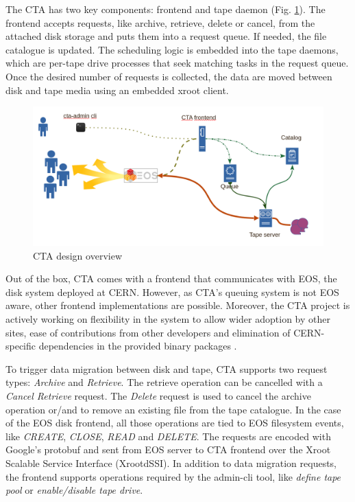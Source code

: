 \documentclass{webofc}
\begin{document}
The CTA has two key components: frontend and tape daemon (Fig. \ref{fig:cta_overview}). The frontend accepts requests, like archive, retrieve, delete or cancel, from the attached disk storage and puts them into a request queue. If needed, the file catalogue is updated. The scheduling logic is embedded into the tape daemons, which are per-tape drive processes that seek matching tasks in the request queue. Once the desired number of requests is collected, the data are moved between disk and tape media using an embedded xroot\cite{xrootd} client.

\begin{figure}[h]
    \centering
    \includegraphics[scale=0.25]{cta-design.png}
    \caption{CTA design overview}
    \label{fig:cta_overview}
\end{figure}

Out of the box, CTA comes with a frontend that communicates with EOS, the disk system deployed at CERN. However, as CTA's queuing system is not EOS aware, other frontend implementations are possible. Moreover, the CTA project is actively working on flexibility in the system to allow wider adoption by other sites, ease of contributions from other developers and elimination of CERN-specific dependencies in the provided binary packages \cite{cta_beyond_cern}.

To trigger data migration between disk and tape, CTA supports two request types: \textit{Archive} and \textit{Retrieve}. The retrieve operation can be cancelled with a \textit{Cancel Retrieve} request. The \textit{Delete} request is used to cancel the archive operation or/and to remove an existing file from the tape catalogue. In the case of the EOS disk frontend, all those operations are tied to EOS filesystem events, like \textit{CREATE}, \textit{CLOSE}, \textit{READ} and \textit{DELETE}. The requests are encoded with Google's protobuf \cite{prtobuf} and sent from EOS server to CTA frontend over the Xroot Scalable Service Interface (XrootdSSI). In addition to data migration requests, the frontend supports operations required by the admin-cli tool, like \textit{define tape pool} or \textit{enable/disable tape drive}.
\end{document}
